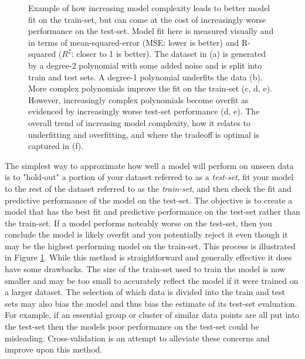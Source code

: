 \begin{figure}
	\caption{Example of how increasing model complexity leads to better model fit on the train-set, but can come at the cost of increasingly worse performance on the test-set. Model fit here is measured visually and in terms of mean-squared-error (MSE: lower is better) and R-squared ($R^2$: closer to 1 is better). The dataset in (a) is generated by a degree-2 polynomial with some added noise and is split into train and test sets. A degree-1 polynomial underfits the data (b). More complex polynomials improve the fit on the train-set (c, d, e). However, increasingly complex polynomials become overfit as evidenced by increasingly worse test-set performance (d, e). The overall trend of increasing model complexity, how it relates to underfitting and overfitting, and where the tradeoff is optimal is captured in (f).}
	\label{fig:overfitting_example}
\end{figure}

The simplest way to approximate how well a model will perform on unseen data is to "hold-out" a portion of your dataset referred to as a \textit{test-set}, fit your model to the rest of the dataset referred to as the \textit{train-set}, and then check the fit and predictive performance of the model on the test-set. The objective is to create a model that has the best fit and predictive performance on the test-set rather than the train-set. If a model performs noteably worse on the test-set, then you conclude the model is likely overfit and you potentially reject it even though it may be the highest performing model on the train-set. This process is illustrated in Figure \ref{fig:overfitting_example}.  While this method is straightforward and generally effective it does have some drawbacks. The size of the train-set used to train the model is now smaller and may be too small to accurately reflect the model if it were trained on a larger dataset. The selection of which data is divided into the train and test sets may also bias the model and thus bias the estimate of its test-set evaluation. For example, if an essential group or cluster of similar data points are all put into the test-set then the models poor performance on the test-set could be misleading. Cross-validation is an attempt to alleviate these concerns and improve upon this method.

